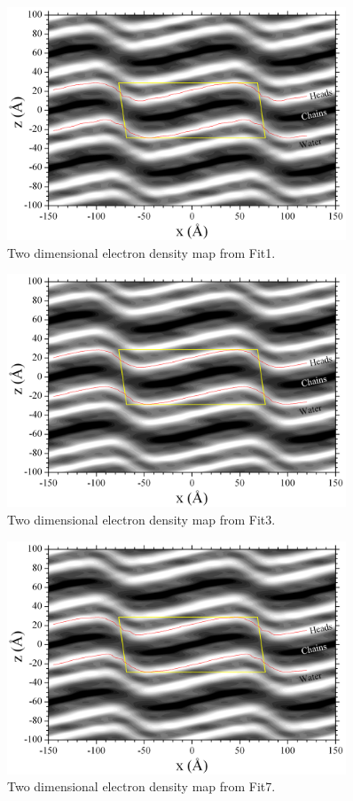 \begin{figure}
  \centering
  \includegraphics[width=0.9\textwidth]{figures/ripple/LAXS/Fit1_2D_edp}
  \caption[]{Two dimensional electron density map from Fit1.}
  \label{fig:Fit1_2D_edp}
\end{figure}

\begin{figure}
  \centering
  \includegraphics[width=0.9\textwidth]{figures/ripple/LAXS/Fit3_2D_edp}
  \caption[]{Two dimensional electron density map from Fit3.}
  \label{fig:Fit3_2D_edp}
\end{figure}

\begin{figure}
  \centering
  \includegraphics[width=0.9\textwidth]{figures/ripple/LAXS/Fit7_2D_edp}
  \caption[]{Two dimensional electron density map from Fit7.}
  \label{fig:Fit7_2D_edp}
\end{figure}

